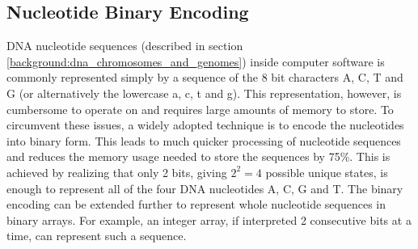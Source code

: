 \subsection{Nucleotide Binary Encoding} \label{background:nucleotide_binary_encoding}

DNA nucleotide sequences (described in section \ref{background:dna_chromosomes_and_genomes}) inside computer software is commonly represented simply by a sequence of the 8 bit characters A, C, T and G (or alternatively the lowercase a, c, t and g).
This representation, however, is cumbersome to operate on and requires large amounts of memory to store.
To circumvent these issues, a widely adopted technique is to encode the nucleotides into binary form.
This leads to much quicker processing of nucleotide sequences and reduces the memory usage needed to store the sequences by 75\%.
This is achieved by realizing that only 2 bits, giving \textit{$2^2=4$} possible unique states, is enough to represent all of the four DNA nucleotides A, C, G and T.
The binary encoding can be extended further to represent whole nucleotide sequences in binary arrays.
For example, an integer array, if interpreted 2 consecutive bits at a time, can represent such a sequence.


